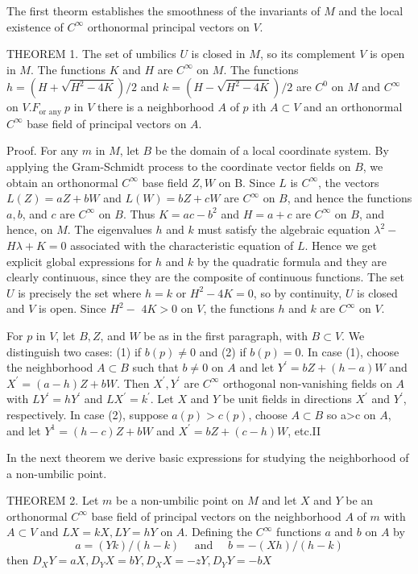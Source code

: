 \documentclass[10pt]{article}
\begin{document}
The first theorm establishes the smoothness of the invariants of $M$ and the local existence of $C^{\infty}$ orthonormal principal vectors on $V$.

THEOREM 1. The set of umbilics $U$ is closed in $M$, so its complement $V$ is open in $M$. The functions $K$ and $H$ are $C^{\infty}$ on $M$. The functions $h=\left(H+\sqrt{H^{2}-4 K}\right) / 2$ and $k=\left(H-\sqrt{H^{2}-4 K}\right) / 2$ are $C^{0}$ on $M$ and $C^{\infty}$ on $V . F_{\text {or any }} p$ in $V$ there is a neighborhood $A$ of $p$ ith $A \subset V$ and an orthonormal $C^{\infty}$ base field of principal vectors on $A .$

Proof. For any $m$ in $M$, let $B$ be the domain of a local coordinate system. By applying the Gram-Schmidt process to the coordinate vector fields on $B$, we obtain an orthonormal $C^{\infty}$ base field $Z, W$ on B. Since $L$ is $C^{\infty}$, the vectors $L(Z)=a Z+b W$ and $L(W)=b Z+c W$ are $C^{\infty}$ on $B$, and hence the functions $a, b$, and $c$ are $C^{\infty}$ on $B$. Thus $K=a c-b^{2}$ and $H=a+c$ are $C^{\infty}$ on $B$, and hence, on $M$. The eigenvalues $h$ and $k$ must satisfy the algebraic equation $\lambda^{2}-$ $H \lambda+K=0$ associated with the characteristic equation of $L$. Hence we get explicit global expressions for $h$ and $k$ by the quadratic formula and they are clearly continuous, since they are the composite of continuous functions. The set $U$ is precisely the set where $h=k$ or $H^{2}-4 K=0$, so by continuity, $U$ is closed and $V$ is open. Since $H^{2}-$ $4 K>0$ on $V$, the functions $h$ and $k$ are $C^{\infty}$ on $V$.

For $p$ in $V$, let $B, Z$, and $W$ be as in the first paragraph, with $B \subset V .$ We distinguish two cases: (1) if $b(p) \neq 0$ and (2) if $b(p)=0$. In case (1), choose the neighborhood $A \subset B$ such that $b \neq 0$ on $A$ and let $Y^{\prime}=b Z+(h-a) W$ and $X^{\prime}=(a-h) Z+b W$. Then $X^{\prime}, Y^{\prime}$ are $C^{\infty}$ orthogonal non-vanishing fields on $A$ with $L Y^{\prime}=h Y^{\prime}$ and $L X^{\prime}=k^{\prime}$. Let $X$ and $Y$ be unit fields in directions $X^{\prime}$ and $Y^{\prime}$, respectively. In case (2), suppose $a(p)>c(p)$, choose $A \subset B$ so a>c on $A$, and let $Y^{1}=(h-c) Z+b W$ and $X^{\prime}=b Z+(c-h) W$, etc.II

In the next theorem we derive basic expressions for studying the neighborhood of a non-umbilic point.

THEOREM 2. Let $m$ be a non-umbilic point on $M$ and let $X$ and $Y$ be an orthonormal $C^{\infty}$ base field of principal vectors on the neighborhood $A$ of $m$ with $A \subset V$ and $L X=k X, L Y=h Y$ on $A$. Defining the $C^{\infty}$ functions $a$ and $b$ on $A$ by
$$
a=(Y k) /(h-k) \quad \text { and } \quad b=-(X h) /(h-k)
$$
then $D_{X} Y=a X, D_{Y} X=b Y, D_{X} X=-z Y, D_{Y} Y=-b X$
\end{document}
